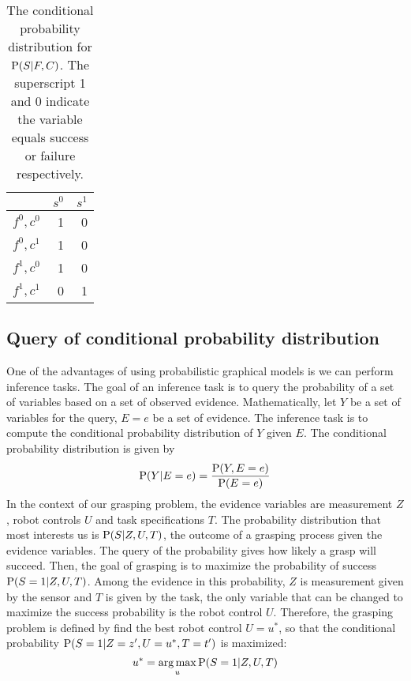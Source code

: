 \begin{table}[!htbp]
\centering
\begin{tabular}{|l|r|r|}
\hline
& $s^0$ & $s^1$ \\ \hline
$f^0, c^0$ & 1     & 0     \\ \hline
$f^0, c^1$ & 1     & 0     \\ \hline
$f^1, c^0$ & 1     & 0     \\ \hline
$f^1, c^1$ & 0     & 1     \\ \hline
\end{tabular}
\caption{The conditional probability distribution for $\operatorname*{\text{P}} (S | F, C )$. The superscript 1 and 0 indicate the variable equals success or failure respectively.}
\label{tab:cpd}
\end{table}

\subsection{Query of conditional probability distribution}
One of the advantages of using probabilistic graphical models is we can perform inference tasks. The goal of an inference task is to query the probability of a set of variables based on a set of observed evidence. Mathematically, let $Y$ be a set of variables for the query, $E = e$ be a set of evidence. The inference task is to compute the conditional probability  distribution of $Y$ given $E$. The conditional probability distribution is given by 
\begin{equation}
\operatorname*{\text{P}} (Y|E = e) =  \frac{\operatorname*{\text{P}} (Y, E = e)} {\operatorname*{\text{P}} (E = e)}
\end{equation}
In the context of our grasping problem, the evidence variables are measurement $Z$, robot controls $U$ and task specifications $T$. The probability distribution that most interests us is $\operatorname*{\text{P}}(S | Z, U, T) $, the outcome of a grasping process given the evidence variables. The query of the probability gives how likely a grasp will succeed. Then, the goal of grasping is to maximize the probability of success $\operatorname*{\text{P}}(S = 1 | Z, U, T) $. Among the evidence in this probability, $Z$ is measurement given by the sensor and $T$ is given by the task, the only variable that can be changed to maximize the success probability is the robot control $U$. Therefore, the grasping problem is defined by find the best robot control $U = u^*$, so that the conditional probability $\operatorname*{\text{P}}(S = 1 | Z = z', U=u^* , T = t') $ is maximized: 
\begin{equation}
 u^* = \operatorname*{arg\,max}_{u} \operatorname*{\text{P}} (S = 1| Z , U ,T)  
\label{equ:argmax_probS}
\end{equation}

